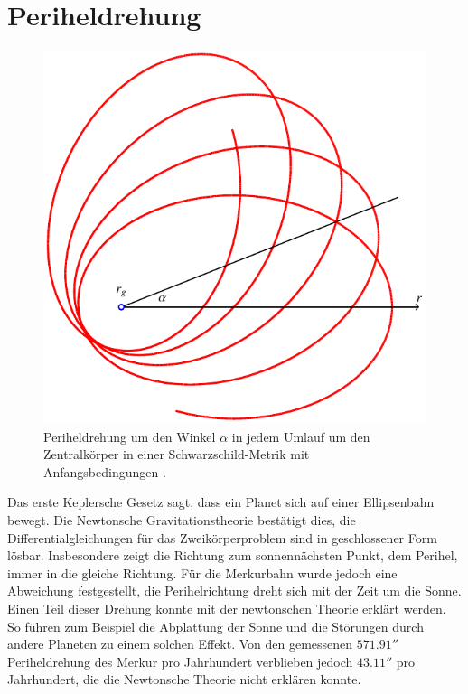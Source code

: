 %
%
%

\section{Periheldrehung%
\label{skript:chapters:s-perihel}}
\begin{figure}
\centering
\includegraphics{chapters/tikz/orbit.pdf}
\caption{Periheldrehung um den Winkel $\alpha$ in jedem Umlauf um den
Zentralkörper in einer Schwarzschild-Metrik mit Anfangsbedingungen
\label{skript:schwarzschild:anfangsbedingung:normal}.
\label{skript:schwarzschild:perihelorbit}}
\end{figure}
Das erste Keplersche Gesetz sagt, dass ein Planet sich auf einer
Ellipsenbahn bewegt.
Die Newtonsche Gravitationstheorie bestätigt dies, die Differentialgleichungen
für das Zweikörperproblem sind in geschlossener Form lösbar.
Insbesondere zeigt die Richtung zum sonnennächsten Punkt, dem Perihel,
immer in die gleiche Richtung.
Für die Merkurbahn wurde jedoch eine Abweichung festgestellt, die
Perihelrichtung dreht sich mit der Zeit um die Sonne.
Einen Teil dieser Drehung konnte mit der newtonschen Theorie erklärt werden.
So führen zum Beispiel die Abplattung der Sonne und die Störungen durch
andere Planeten zu einem solchen Effekt.
Von den gemessenen $571.91''$ Periheldrehung des Merkur pro Jahrhundert
verblieben jedoch $43.11''$ pro Jahrhundert, die die Newtonsche
Theorie nicht erklären konnte.


